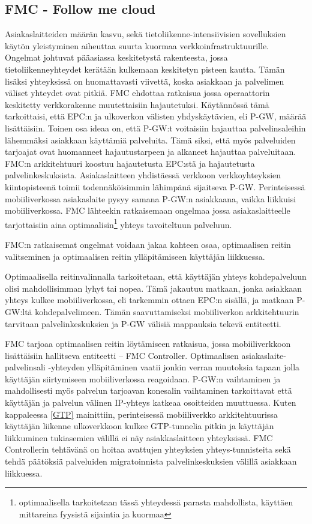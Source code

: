 \subsection{FMC - Follow me cloud} \label{fmc}

Asiakaslaitteiden määrän kasvu, sekä tietoliikenne-intensiivisien sovelluksien käytön yleistyminen aiheuttaa suurta kuormaa verkkoinfrastruktuurille. Ongelmat johtuvat pääasiassa keskitetystä rakenteesta, jossa tietoliikenneyhteydet kerätään kulkemaan keskitetyn pisteen kautta. Tämän lisäksi yhteyksissä on huomattavasti viivettä, koska asiakkaan ja palvelimen väliset yhteydet ovat pitkiä. FMC ehdottaa ratkaisua jossa operaattorin keskitetty verkkorakenne muutettaisiin hajautetuksi. \cite{taleb2013follow}
Käytännössä tämä tarkoittaisi, että EPC:n ja ulkoverkon välisten yhdyskäytävien, eli P-GW, määrää lisättäisiin. 
Toinen osa ideaa on, että P-GW:t voitaisiin hajauttaa palvelinsaleihin lähemmäksi asiakkaan käyttämiä palveluita. Tämä siksi, että myös palveluiden tarjoajat ovat huomanneet hajautustarpeen ja alkaneet hajauttaa palveluitaan. 
FMC:n arkkitehtuuri koostuu hajautetusta EPC:stä ja hajautetusta palvelinkeskuksista. Asiakaslaitteen yhdistäessä verkkoon verkkoyhteyksien kiintopisteenä toimii todennäköisimmin lähimpänä sijaitseva P-GW. Perinteisessä mobiiliverkossa asiakaslaite pysyy samana P-GW:n asiakkaana, vaikka liikkuisi mobiiliverkossa. FMC lähteekin ratkaisemaan ongelmaa jossa asiakaslaitteelle tarjottaisiin aina optimaalisin\footnote{optimaalisella tarkoitetaan tässä yhteydessä parasta mahdollista, käyttäen mittareina fyysistä sijaintia ja kuormaa} yhteys tavoiteltuun palveluun.

FMC:n ratkaisemat ongelmat voidaan jakaa kahteen osaa, optimaalisen reitin valitseminen ja optimaalisen reitin ylläpitämiseen käyttäjän liikkuessa. 

Optimaalisella reitinvalinnalla tarkoitetaan, että käyttäjän yhteys kohdepalveluun olisi mahdollisimman lyhyt tai nopea. Tämä jakautuu matkaan, jonka asiakkaan yhteys kulkee mobiiliverkossa, eli tarkemmin ottaen EPC:n sisällä, ja matkaan P-GW:ltä kohdepalvelimeen. Tämän saavuttamiseksi mobiiliverkon arkkitehtuurin tarvitaan palvelinkeskuksien ja P-GW välisiä mappauksia tekevä entiteetti. 

FMC tarjoaa optimaalisen reitin löytämiseen ratkaisua, jossa mobiiliverkkoon lisättäisiin hallitseva entiteetti – FMC Controller. 
Optimaalisen asiakaslaite-palvelinsali -yhteyden ylläpitäminen vaatii jonkin verran muutoksia tapaan jolla käyttäjän siirtymiseen mobiiliverkossa reagoidaan. P-GW:n vaihtaminen ja mahdollisesti myös palvelun tarjoavan konesalin vaihtaminen tarkoittavat että käyttäjän ja palvelun välinen IP-yhteys katkeaa osoitteiden muuttuessa. Kuten kappaleessa \ref{GTP} mainittiin, perinteisessä mobiiliverkko arkkitehtuurissa käyttäjän liikenne ulkoverkkoon kulkee GTP-tunnelia pitkin ja käyttäjän liikkuminen tukiasemien välillä ei näy asiakkaslaitteen yhteyksissä. FMC Controllerin tehtävänä on hoitaa avattujen yhteyksien yhteys-tunnisteita sekä tehdä päätöksiä palveluiden migratoinnista palvelinkeskuksien välillä asiakkaan liikkuessa.

